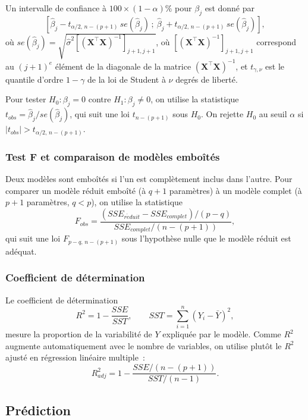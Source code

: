 \documentclass[11pt,letterpaper]{article}
\begin{document}
Un intervalle de confiance à $100\times(1-\alpha)\%$ pour $\beta_j$ est donné par
$$\left[\hat\beta_j - t_{\alpha/2,\,n-(p+1)}\, se(\hat\beta_j)\,;\ \hat\beta_j + t_{\alpha/2,\,n-(p+1)}\, se(\hat\beta_j)\right],$$
où $se(\hat\beta_j) = \sqrt{\hat\sigma^2 \left[(\boldsymbol{X^\top X})^{-1}\right]_{j+1,j+1}}$, où $\left[(\boldsymbol{X^\top X})^{-1}\right]_{j+1,j+1}$ correspond au $(j+1)^e$ élément de la diagonale de la matrice $(\boldsymbol{X^\top X})^{-1}$, et $t_{\gamma,\nu}$ est le quantile d'ordre $1-\gamma$ de la loi de Student à $\nu$ degrés de liberté.

Pour tester $H_0: \beta_j = 0$ contre $H_1 : \beta_j \neq 0$, on utilise la statistique $t_{obs} = \hat\beta_j / se(\hat\beta_j)$, qui suit une loi $t_{n-(p+1)}$ sous $H_0$. On rejette $H_0$ au seuil $\alpha$ si $|t_{obs}| > t_{\alpha/2,\,n-(p+1)}$.

\subsubsection{Test F et comparaison de modèles emboîtés}

Deux modèles sont emboîtés si l'un est complètement inclus dans l'autre. Pour comparer un modèle réduit emboîté (à $q+1$ paramètres) à un modèle complet (à $p+1$ paramètres, $q < p$), on utilise la statistique
$$F_{obs} = \frac{(SSE_{r\acute{e}duit} - SSE_{complet})/(p-q)}{SSE_{complet}/(n-(p+1))},$$
qui suit une loi $F_{p-q,\, n-(p+1)}$ sous l'hypothèse nulle que le modèle réduit est adéquat.

\subsubsection{Coefficient de détermination}

Le coefficient de détermination
$$R^2 = 1 - \frac{SSE}{SST}, \qquad SST = \sum_{i=1}^n (Y_i - \bar Y)^2,$$
mesure la proportion de la variabilité de $Y$ expliquée par le modèle. Comme $R^2$ augmente automatiquement avec le nombre de variables, on utilise plutôt le $R^2$ ajusté en régression linéaire multiple~:
$$R^2_{adj} = 1 - \frac{SSE/(n-(p+1))}{SST/(n-1)}.$$

\subsection{Prédiction}
\end{document}
